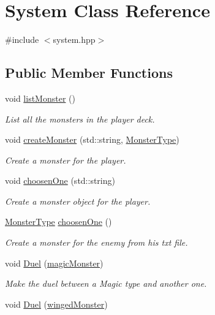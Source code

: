 \hypertarget{classSystem}{}\section{System Class Reference}
\label{classSystem}


{\ttfamily \#include $<$system.\+hpp$>$}

\subsection*{Public Member Functions}
\begin{DoxyCompactItemize}
\item 
void \hyperlink{classSystem_a253f3796b5fc8c6f46071127314bdea3}{list\+Monster} ()
\begin{DoxyCompactList}\small\item\em List all the monsters in the player deck. \end{DoxyCompactList}\item 
void \hyperlink{classSystem_a8b3108670ea7c2aa6fc3f6363db1bee0}{create\+Monster} (std\+::string, \hyperlink{classMonsterType}{Monster\+Type})
\begin{DoxyCompactList}\small\item\em Create a monster for the player. \end{DoxyCompactList}\item 
void \hyperlink{classSystem_a0c26123b747ca23a6cd37f46dc107781}{choosen\+One} (std\+::string)
\begin{DoxyCompactList}\small\item\em Create a monster object for the player. \end{DoxyCompactList}\item 
\hyperlink{classMonsterType}{Monster\+Type} \hyperlink{classSystem_a85b01762246c0a9392398331a5b39d9e}{choosen\+One} ()
\begin{DoxyCompactList}\small\item\em Create a monster for the enemy from his txt file. \end{DoxyCompactList}\item 
void \hyperlink{classSystem_aa90bea1c6f38f6536ad2741d01d21e10}{Duel} (\hyperlink{classmagicMonster}{magic\+Monster})
\begin{DoxyCompactList}\small\item\em Make the duel between a Magic type and another one. \end{DoxyCompactList}\item 
void \hyperlink{classSystem_a8f5809666976638b9ed48ca83558e90a}{Duel} (\hyperlink{classwingedMonster}{winged\+Monster})

\end{DoxyCompactItemize}

